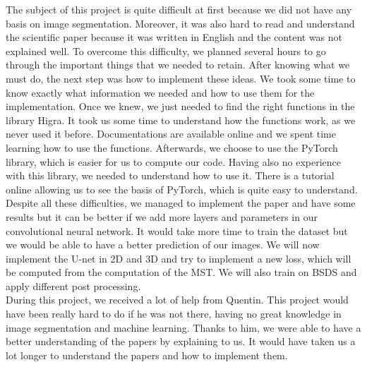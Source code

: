 The subject of this project is quite difficult at first because we did not have
any basis on image segmentation. Moreover, it was also hard to read and
understand the scientific paper because it was written in English and the
content was not explained well. To overcome this difficulty, we planned several
hours to go through the important things that we needed to retain. After
knowing what we must do, the next step was how to implement these ideas. We
took some time to know exactly what information we needed and how to use them
for the implementation. Once we knew, we just needed to find the right functions in the library Higra. It took us some time to understand how the functions work, as we never used it before. Documentations are available online and we spent time learning how to use the functions. Afterwards, we choose to use the PyTorch library, which is easier for us to compute our code. Having also no experience with this library, we needed to understand how to use it.
There is a tutorial online allowing us to see the basis of PyTorch, which is
quite easy to understand.  \\

Despite all these difficulties, we managed to implement the paper and have some results but it can be better if we add more layers and parameters in our convolutional neural network. It would take more time to train the dataset but we would be able to have a better prediction of our images. We will now implement the U-net in 2D and 3D and try to implement a new loss, which will be computed from the computation of the MST. We will also train on BSDS and apply different post processing. \\

During this project, we received a lot of help from Quentin. This project would
have been really hard to do if he was not there, having no great knowledge in
image segmentation and machine learning. Thanks to him, we were able to have a
better understanding of the papers by explaining to us. It would have taken us
a lot longer to understand the papers and how to implement them. \\
